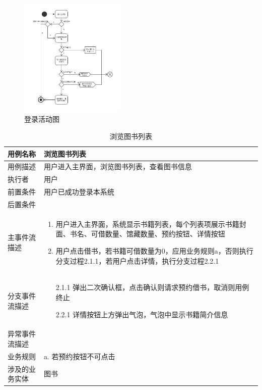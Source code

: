 \begin{figure}[H]
    \centering  %
    \includegraphics[width=0.45\textwidth]{./Chapters/images/activity_login.png}
    \caption{登录活动图}
    \label{登录活动图}
\end{figure}
\begin{table}[hp]
    \centering
    \caption{浏览图书列表}
	\begin{tabular*}{\textwidth}{p{}|p{}}
    \hline
    用例名称    & 浏览图书列表    \\ \hline
    用例描述    & 用户进入主界面，浏览图书列表，查看图书信息    \\ \hline
    执行者     & 用户         \\ \hline
    前置条件    & 用户已成功登录本系统   \\ \hline
    后置条件    & ~     \\ \hline
    主事件流描述  & \begin{enumerate} 
            \item 用户进入主界面，系统显示书籍列表，每个列表项展示书籍封面、书名、可借数量、馆藏数量、预约按钮、详情按钮
            \item 用户点击借书，若书籍可借数量为0，应用业务规则a，否则执行分支过程2.1.1，若用户点击详情，执行分支过程2.2.1
        \end{enumerate} \\ \hline
    分支事件流描述 & \begin{itemize} 
        \item[2.1.1] 弹出二次确认框，点击确认则请求预约借书，取消则用例终止
        \item[2.2.1] 详情按钮上方弹出气泡，气泡中显示书籍简介信息
    \end{itemize}     \\ \hline
    异常事件流描述 & ~  \\ \hline   
    业务规则    &  a. 若预约按钮不可点击  \\ \hline
    涉及的业务实体 & 图书      \\ \hline
\end{tabular*}
\end{table}
